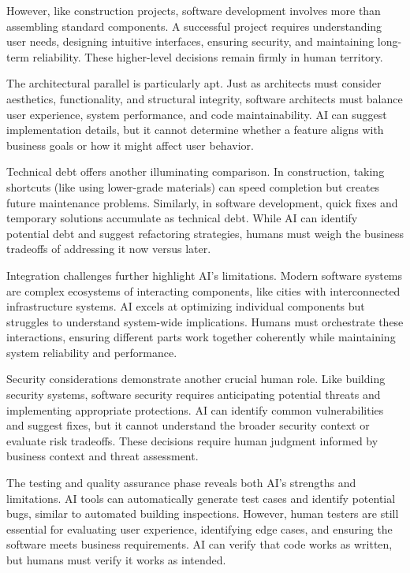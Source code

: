 \documentclass[
  Letterpaper,
]{scrbook}
\begin{document}
However, like construction projects, software development involves more
than assembling standard components. A successful project requires
understanding user needs, designing intuitive interfaces, ensuring
security, and maintaining long-term reliability. These higher-level
decisions remain firmly in human territory.

The architectural parallel is particularly apt. Just as architects must
consider aesthetics, functionality, and structural integrity, software
architects must balance user experience, system performance, and code
maintainability. AI can suggest implementation details, but it cannot
determine whether a feature aligns with business goals or how it might
affect user behavior.

Technical debt offers another illuminating comparison. In construction,
taking shortcuts (like using lower-grade materials) can speed completion
but creates future maintenance problems. Similarly, in software
development, quick fixes and temporary solutions accumulate as technical
debt. While AI can identify potential debt and suggest refactoring
strategies, humans must weigh the business tradeoffs of addressing it
now versus later.

Integration challenges further highlight AI's limitations. Modern
software systems are complex ecosystems of interacting components, like
cities with interconnected infrastructure systems. AI excels at
optimizing individual components but struggles to understand system-wide
implications. Humans must orchestrate these interactions, ensuring
different parts work together coherently while maintaining system
reliability and performance.

Security considerations demonstrate another crucial human role. Like
building security systems, software security requires anticipating
potential threats and implementing appropriate protections. AI can
identify common vulnerabilities and suggest fixes, but it cannot
understand the broader security context or evaluate risk tradeoffs.
These decisions require human judgment informed by business context and
threat assessment.

The testing and quality assurance phase reveals both AI's strengths and
limitations. AI tools can automatically generate test cases and identify
potential bugs, similar to automated building inspections. However,
human testers are still essential for evaluating user experience,
identifying edge cases, and ensuring the software meets business
requirements. AI can verify that code works as written, but humans must
verify it works as intended.
\end{document}
